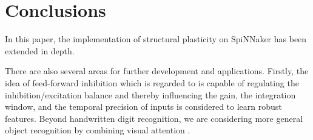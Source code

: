 \documentclass[letterpaper, 10 pt, conference]{ieeeconf}  %
\begin{document}
\section{Conclusions}\label{sec:conclusions}
In this paper, the implementation of structural plasticity on SpiNNaker has been extended in depth.

There are also several areas for further development and applications.
Firstly, the idea of feed-forward inhibition which is regarded to is capable of regulating the inhibition/excitation balance and thereby influencing the gain, the integration window, and the temporal precision of inputs \cite{DSouza2016} is considered to learn robust features.
Beyond handwritten digit recognition, we are considering more general object recognition by combining visual attention \cite{Rea2013}.

%
%





\end{document}
